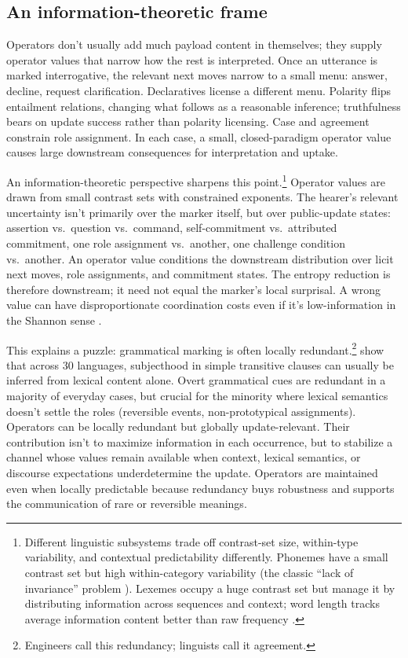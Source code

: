 \documentclass[12pt,letterpaper]{article}
\begin{document}
\subsection{An information-theoretic frame}

Operators don't usually add much payload content in themselves; they supply operator values that narrow how the rest is interpreted. Once an utterance is marked interrogative, the relevant next moves narrow to a small menu: answer, decline, request clarification. Declaratives license a different menu. Polarity flips entailment relations, changing what follows as a reasonable inference; truthfulness bears on update success rather than polarity licensing. Case and agreement constrain role assignment. In each case, a small, closed-paradigm operator value causes large downstream consequences for interpretation and uptake.

An information-theoretic perspective sharpens this point.\footnote{Different linguistic subsystems trade off contrast-set size, within-type variability, and contextual predictability differently. Phonemes have a small contrast set but high within-category variability (the classic \enquote{lack of invariance} problem \citep{libermanetal1967}). Lexemes occupy a huge contrast set but manage it by distributing information across sequences and context; word length tracks average information content better than raw frequency \citep{piantadositilygibson2011}.} Operator values are drawn from small contrast sets with constrained exponents. The hearer's relevant uncertainty isn't primarily over the marker itself, but over public-update states: assertion vs.\ question vs.\ command, self-commitment vs.\ attributed commitment, one role assignment vs.\ another, one challenge condition vs.\ another. An operator value conditions the downstream distribution over licit next moves, role assignments, and commitment states. The entropy reduction is therefore downstream; it need not equal the marker's local surprisal. A wrong value can have disproportionate coordination costs even if it's low-information in the Shannon sense \citep{shannon1948,coverthomas2006}.

{\sloppy This explains a puzzle: grammatical marking is often locally redundant.\footnote{Engineers call this redundancy; linguists call it agreement.} \textcite{mahowaldetal2023} show that across 30 languages, subjecthood in simple transitive clauses can usually be inferred from lexical content alone. Overt grammatical cues are redundant in a majority of everyday cases, but crucial for the minority where lexical semantics doesn't settle the roles (reversible events, non-prototypical assignments). Operators can be locally redundant but globally update-relevant. Their contribution isn't to maximize information in each occurrence, but to stabilize a channel whose values remain available when context, lexical semantics, or discourse expectations underdetermine the update. Operators are maintained even when locally predictable because redundancy buys robustness and supports the communication of rare or reversible meanings.\par}
\end{document}
